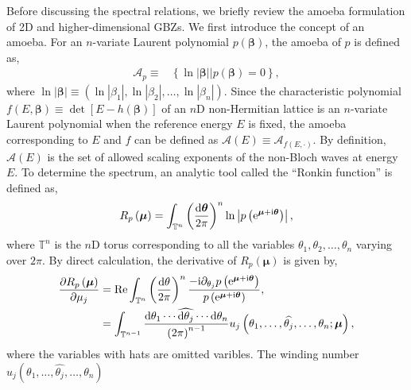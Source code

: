 \documentclass[pdflatex,sn-nature, iicol]{sn-jnl}%
\theoremstyle{thmstyleone}%
\theoremstyle{thmstyletwo}%
\theoremstyle{thmstylethree}%
\begin{document}
Before discussing the spectral relations, we briefly review the amoeba
formulation of 2D and higher-dimensional GBZs. We first introduce
the concept of an amoeba. For an $n$-variate Laurent polynomial $p(\boldsymbol{\beta})$,
the amoeba of $p$ is defined as, 
\begin{align}
\mathcal{A}_{p}\equiv & \left\{ \ln\left|\boldsymbol{\beta}\right||p\left(\boldsymbol{\beta}\right)=0\right\} ,\label{eq:definition-Amoeba}
\end{align}
where $\ln\left|\boldsymbol{\beta}\right|\equiv\left(\ln\left|\beta_{1}\right|,\ln\left|\beta_{2}\right|,\dots,\ln\left|\beta_{n}\right|\right)$.
Since the characteristic polynomial $f(E,\boldsymbol{\beta})\equiv\det[E-h(\boldsymbol{\beta})]$
of an $n$D non-Hermitian lattice is an $n$-variate Laurent polynomial
when the reference energy $E$ is fixed, the amoeba corresponding
to $E$ and $f$ can be defined as $\mathcal{A}\left(E\right)\equiv\mathcal{A}_{f\left(E,\cdot\right)}$.
By definition, $\mathcal{A}\left(E\right)$ is the set of allowed
scaling exponents of the non-Bloch waves at energy $E$. To determine
the spectrum, an analytic tool called the ``Ronkin function'' is
defined as, 
\begin{equation}
R_{p}\left(\boldsymbol{\mu}\right)=\int_{\mathbb{T}^{n}}\left(\frac{\mathrm{d}\boldsymbol{\theta}}{2\pi}\right)^{n}\ln\left|p\left(\mathrm{e}^{\boldsymbol{\mu}+\mathrm{i}\boldsymbol{\theta}}\right)\right|,\label{eq:Ronkin-function}
\end{equation}
where $\mathbb{T}^{n}$ is the $n$D torus corresponding to all the
variables $\theta_{1},\theta_{2},\dots,\theta_{n}$ varying over $2\pi$.
By direct calculation, the derivative of $R_{p}\left(\boldsymbol{\mu}\right)$
is given by, 
\begin{align}
\frac{\partial R_{p}\left(\boldsymbol{\mu}\right)}{\partial\mu_{j}} & =\text{Re}\int_{\mathbb{T}^{n}}\left(\frac{\mathrm{d}\theta}{2\pi}\right)^{n}\frac{-\mathrm{i}\partial_{\theta_{j}}p\left(\mathrm{e}^{\boldsymbol{\mu}+\mathrm{i}\boldsymbol{\theta}}\right)}{p\left(\mathrm{e}^{\boldsymbol{\mu}+\mathrm{i}\boldsymbol{\theta}}\right)},\nonumber \\
 & =\int_{\mathbb{T}^{n-1}}\frac{\mathrm{d}\theta_{1}\cdots\widehat{\mathrm{d}\theta_{j}}\cdots\mathrm{d}\theta_{n}}{\left(2\pi\right)^{n-1}}u_{j}\left(\theta_{1},\dots,\widehat{\theta_{j}},\dots,\theta_{n};\boldsymbol{\mu}\right),\label{eq:derivative-Ronkin}
\end{align}
where the variables with hats are omitted varibles. The winding number
$u_{j}\left(\theta_{1},\dots,\widehat{\theta_{j}},\dots,\theta_{n}\right)$
\end{document}

